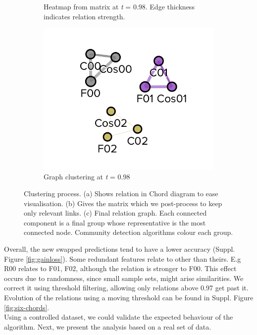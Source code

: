 \begin{figure}[!hb]
\begin{subfigure}[b]{0.3\linewidth}
		\caption{Heatmap from matrix at \emph{t} = 0.98. Edge thickness indicates relation strength.}
	\end{subfigure}
	\hfill
	\begin{subfigure}[b]{0.3\linewidth}
		\includegraphics[width=\linewidth]{Minor Thesis/figures/graphs/graph-toy.png}
		\caption{Graph clustering at \emph{t} = 0.98}
	\end{subfigure}
	\caption{Clustering process. (a) Shows relation in Chord diagram to ease visualisation. (b) Gives the matrix which we post-process to keep only relevant links. (c) Final relation graph. Each connected component is a final group whose representative is the most connected node. Community detection algorithms colour each group.}
	\label{fig:triade}
\end{figure}

Overall, the new swapped predictions tend to have a lower accuracy (Suppl. Figure \ref{fig:gainloss}). Some redundant features relate to other than theirs. E.g R00 relates to F01, F02, although the relation is stronger to F00. This effect occurs due to randomness, since small sample sets, might arise similarities. We correct it using threshold filtering, allowing only relations above 0.97 get past it. Evolution of the relations using a moving threshold can be found in Suppl. Figure \ref{fig:six-chords}.
\\

Using a controlled dataset, we could validate the expected behaviour of the algorithm. Next, we present the analysis based on a real set of data.

